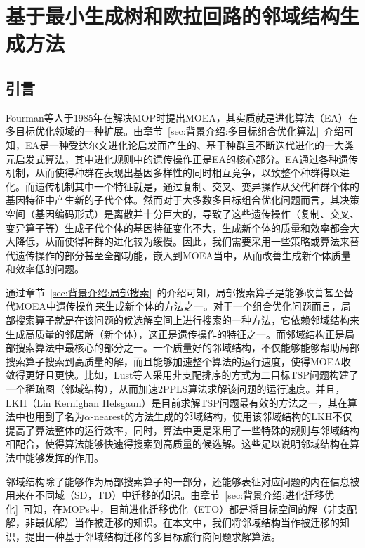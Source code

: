 \chapter{基于最小生成树和欧拉回路的邻域结构生成方法}
\label{chap:NS_Method}

\section{引言}
\label{sec:NS_Method:引言}
Fourman等人于1985年在解决MOP时提出MOEA\cite{fourman1985compaction,schaffer1985multiple}，其实质就是进化算法（EA）在多目标优化领域的一种扩展。由章节~\ref{sec:背景介绍:多目标组合优化算法}~介绍可知，EA是一种受达尔文进化论启发而产生的、基于种群且不断迭代进化的一大类元启发式算法，其中进化规则中的遗传操作正是EA的核心部分。EA通过各种遗传机制，从而使得种群在表现出基因多样性的同时相互竞争，以致整个种群得以进化。而遗传机制其中一个特征就是，通过复制、交叉、变异操作从父代种群个体的基因特征中产生新的子代个体。然而对于大多数多目标组合优化问题而言，其决策空间（基因编码形式）是离散并十分巨大的，导致了这些遗传操作（复制、交叉、变异算子等）生成子代个体的基因特征变化不大，生成新个体的质量和效率都会大大降低，从而使得种群的进化较为缓慢。因此，我们需要采用一些策略或算法来替代遗传操作的部分甚至全部功能，嵌入到MOEA当中，从而改善生成新个体质量和效率低的问题。
\par
通过章节~\ref{sec:背景介绍:局部搜索}~的介绍可知，局部搜索算子是能够改善甚至替代MOEA中遗传操作来生成新个体的方法之一。对于一个组合优化问题而言，局部搜索算子就是在该问题的候选解空间上进行搜索的一种方法，它依赖邻域结构来生成高质量的邻居解（新个体），这正是遗传操作的特征之一。而邻域结构正是局部搜索算法中最核心的部分之一。一个质量好的邻域结构，不仅能够能够帮助局部搜索算子搜索到高质量的解，而且能够加速整个算法的运行速度，使得MOEA收敛得更好且更快。比如，Lust等人\cite{lust2010speed}采用非支配排序的方式为二目标TSP问题构建了一个稀疏图（邻域结构），从而加速2PPLS\cite{lust2010two}算法求解该问题的运行速度。并且，LKH（Lin Kernighan Helsgaun）\cite{helsgaun2000effective}是目前求解TSP问题最有效的方法之一，其在算法中也用到了名为$\alpha$-nearest\cite{held1970traveling,held1971traveling}的方法生成的邻域结构，使用该邻域结构的LKH不仅提高了算法整体的运行效率，同时，算法中更是采用了一些特殊的规则与邻域结构相配合，使得算法能够快速得搜索到高质量的候选解。这些足以说明邻域结构在算法中能够发挥的作用。
\par
邻域结构除了能够作为局部搜索算子的一部分，还能够表征对应问题的内在信息被用来在不同域（SD，TD）中迁移的知识。由章节~\ref{sec:背景介绍:进化迁移优化}~可知，在MOPs中，目前进化迁移优化（ETO）都是将目标空间的解（非支配解，非最优解）当作被迁移的知识。在本文中，我们将邻域结构当作被迁移的知识，提出一种基于邻域结构迁移的多目标旅行商问题求解算法。

